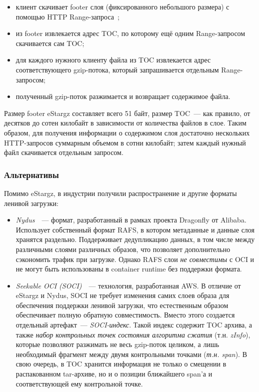 \begin{itemize}
\item клиент скачивает footer слоя (фиксированного небольшого размера) с помощью HTTP Range-запроса~\cite{httprange};
\item из footer извлекается адрес TOC, по которому ещё одним Range-запросом скачивается сам TOC;
\item для каждого нужного клиенту файла из TOC извлекается адрес соответствующего gzip-потока, который запрашивается отдельным Range-запросом;
\item полученный gzip-поток разжимается и возвращает содержимое файла.
\end{itemize}

Размер footer eStargz составляет всего 51 байт, размер TOC~--- как правило, от десятков до сотен килобайт в зависимости от количества файлов в слое. Таким образом, для получения информации о содержимом слоя достаточно нескольких HTTP-запросов суммарным объемом в сотни килобайт; затем каждый нужный файл скачивается отдельным запросом.

\subsubsection{Альтернативы}

Помимо eStargz, в индустрии получили распространение и другие форматы ленивой загрузки:

\begin{itemize}
\item \textit{Nydus}~\cite{nydus}~--- формат, разработанный в рамках проекта Dragonfly от Alibaba. Использует собственный формат RAFS, в котором метаданные и данные слоя хранятся раздельно. Поддерживает дедупликацию данных, в том числе между различными слоями различных образов, что позволяет дополнительно сэкономить трафик при загрузке. Однако RAFS слои \textit{не совместимы} с OCI и не могут быть использованы в container runtime без поддержки формата.
\item \textit{Seekable OCI (SOCI)}~\cite{soci}~--- технология, разработанная AWS. В отличие от eStargz и Nydus, SOCI не требует изменения самих слоев образа для обеспечения поддержки ленивой загрузки, что естественным образом обеспечивает полную обратную совместимость. Вместо этого создается отдельный артефакт~--- \textit{SOCI-индекс}. Такой индекс содержит TOC архива, а также \textit{набор контрольных точек состояния алгоритма сжатия} (т.н. \textit{zInfo}), которые позволяют разжимать не весь gzip-поток целиком, а лишь необходимый фрагмент между двумя контрольными точками (\textit{т.н. span}). В свою очередь, в TOC хранится информация не только о смещении в распакованном tar-архиве, но и о позиции ближайшего span'а и соответствующей ему контрольной точке.
\end{itemize}

